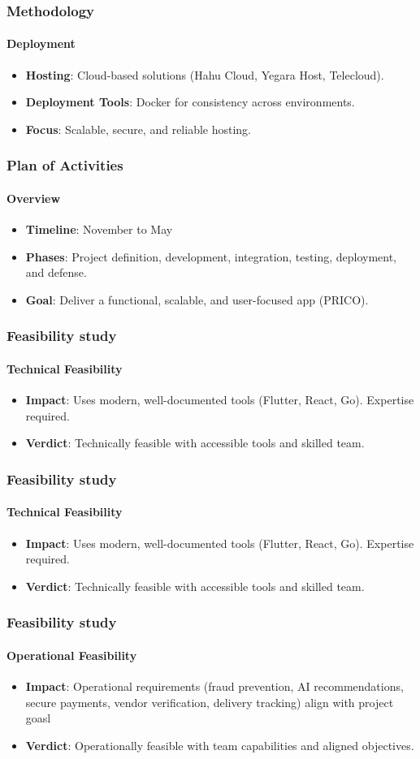 \documentclass{beamer}
\begin{document}
\begin{frame}
	\frametitle{Methodology}
	\framesubtitle{Deployment}
	\begin{itemize}
		\item \textbf{Hosting}: Cloud-based solutions (Hahu Cloud, Yegara Host, Telecloud).
		\item \textbf{Deployment Tools}: Docker for consistency across environments.
		\item \textbf{Focus}: Scalable, secure, and reliable hosting.
	\end{itemize}
\end{frame}

\begin{frame}
	\frametitle{Plan of Activities}
	\framesubtitle{Overview}
	\begin{itemize}
		\item \textbf{Timeline}: November to May
		\item \textbf{Phases}: Project definition, development, integration, testing, deployment, and defense.
		\item \textbf{Goal}: Deliver a functional, scalable, and user-focused app (PRICO).
	\end{itemize}
\end{frame}

\begin{frame}
	\frametitle{Feasibility study}
	\framesubtitle{Technical Feasibility}
	\begin{itemize}
		\item \textbf{Impact}: Uses modern, well-documented tools (Flutter, React, Go). Expertise required.
		\item \textbf{Verdict}: Technically feasible with accessible tools and skilled team.
	\end{itemize}
\end{frame}

\begin{frame}
	\frametitle{Feasibility study}
	\framesubtitle{Technical Feasibility}
	\begin{itemize}
		\item \textbf{Impact}: Uses modern, well-documented tools (Flutter, React, Go). Expertise required.
		\item \textbf{Verdict}: Technically feasible with accessible tools and skilled team.
	\end{itemize}
\end{frame}

\begin{frame}
	\frametitle{Feasibility study}
	\framesubtitle{Operational Feasibility}
	\begin{itemize}
		\item \textbf{Impact}: Operational requirements (fraud prevention, AI recommendations, secure payments, vendor verification, delivery tracking) align with project goasl
		\item \textbf{Verdict}: Operationally feasible with team capabilities and aligned objectives.
	\end{itemize}
\end{frame}
\end{document}

